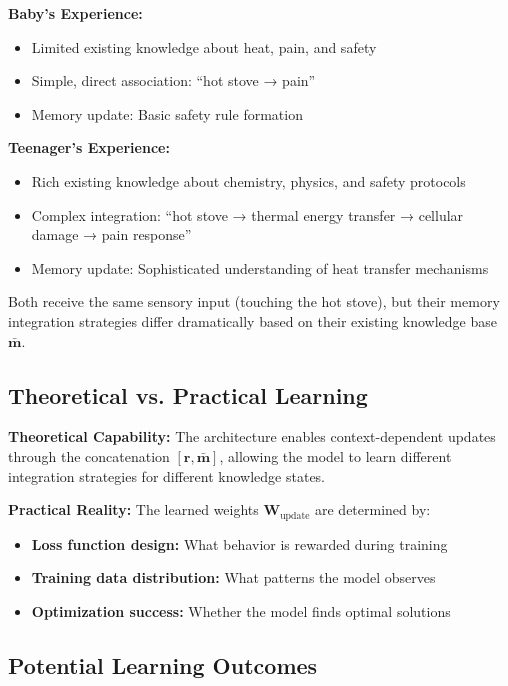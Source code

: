 \documentclass{article}
\begin{document}
\textbf{Baby's Experience:}
\begin{itemize}
\item Limited existing knowledge about heat, pain, and safety
\item Simple, direct association: ``hot stove → pain''
\item Memory update: Basic safety rule formation
\end{itemize}

\textbf{Teenager's Experience:}
\begin{itemize}
\item Rich existing knowledge about chemistry, physics, and safety protocols
\item Complex integration: ``hot stove → thermal energy transfer → cellular damage → pain response''
\item Memory update: Sophisticated understanding of heat transfer mechanisms
\end{itemize}

Both receive the same sensory input (touching the hot stove), but their memory integration strategies differ dramatically based on their existing knowledge base $\bar{\mathbf{m}}$.

\subsection{Theoretical vs. Practical Learning}

\textbf{Theoretical Capability:}
The architecture enables context-dependent updates through the concatenation $[\mathbf{r}, \bar{\mathbf{m}}]$, allowing the model to learn different integration strategies for different knowledge states.

\textbf{Practical Reality:}
The learned weights $\mathbf{W}_{\text{update}}$ are determined by:
\begin{itemize}
\item \textbf{Loss function design:} What behavior is rewarded during training
\item \textbf{Training data distribution:} What patterns the model observes
\item \textbf{Optimization success:} Whether the model finds optimal solutions
\end{itemize}

\subsection{Potential Learning Outcomes}
\end{document}
